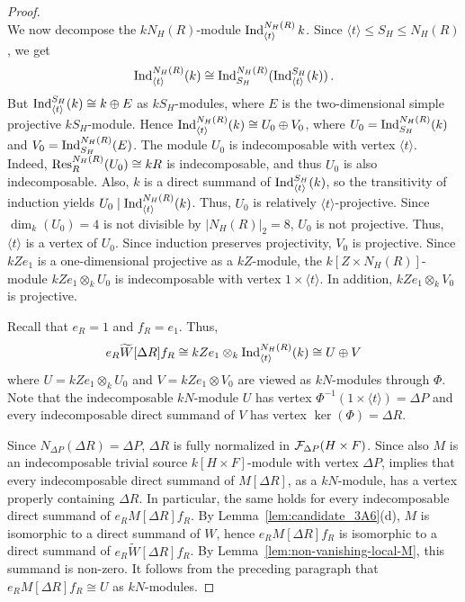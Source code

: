 \begin{proof}
\[    \]
    We now decompose the $kN_H(R)$-module $\operatorname{Ind}^{N_H(R)}_{\langle t\rangle} k$. Since $\langle t\rangle\le S_H\le N_H(R)$, we get 
    \[
    \operatorname{Ind}^{N_H(R)}_{\langle t\rangle}(k)\cong \operatorname{Ind}^{N_H(R)}_{S_H}(\operatorname{Ind}^{S_H}_{\langle t\rangle}(k))\,.
    \]
    But $\operatorname{Ind}^{S_H}_{\langle t\rangle}(k)\cong k\oplus E$ as $kS_H$-modules, where $E$ is the two-dimensional simple projective $kS_H$-module. Hence $\operatorname{Ind}^{N_H(R)}_{\langle t\rangle}(k)\cong U_0\oplus V_0$, where $U_0=\operatorname{Ind}^{N_H(R)}_{S_H}(k)$ and $V_0=\operatorname{Ind}^{N_H(R)}_{S_H}(E)$. The module $U_0$ is indecomposable with vertex $\langle t\rangle$. Indeed, $\operatorname{Res}^{N_H(R)}_R(U_0)\cong kR$ is indecomposable, and thus $U_0$ is also indecomposable. Also, $k$ is a direct summand of $\operatorname{Ind}^{S_H}_{\langle t\rangle}(k)$, so the transitivity of induction yields $U_0\mid \operatorname{Ind}^{N_H(R)}_{\langle t\rangle}(k)$. Thus, $U_0$ is relatively $\langle t\rangle$-projective. Since $\dim_k(U_0)=4$ is not divisible by $|N_H(R)|_2=8$, $U_0$ is not projective. Thus, $\langle t\rangle$ is a vertex of $U_0$. Since induction preserves projectivity, $V_0$ is projective. Since $kZe_1$ is a one-dimensional projective as a $kZ$-module, the $k[Z\times N_H(R)]$-module $kZe_1\otimes_k U_0$ is indecomposable with vertex $1\times \langle t\rangle$. In addition, $kZe_1\otimes_k V_0$ is projective. 

    Recall that $e_R=1$ and $f_R=e_1$. Thus,
    \[
    e_R\widetilde{W}[\Delta R]f_R\cong kZe_1\otimes_k \operatorname{Ind}^{N_H(R)}_{\langle t\rangle}(k)\cong U\oplus V
    \]
    where $U=kZe_1\otimes_k U_0$ and $V=kZe_1\otimes V_0$ are viewed as $kN$-modules through $\Phi$. Note that the indecomposable $kN$-module $U$ has vertex $\Phi^{-1}(1\times \langle t\rangle)=\Delta P$ and every indecomposable direct summand of $V$ has vertex $\ker(\Phi)=\Delta R$. 

    Since $N_{\Delta P}(\Delta R)= \Delta P$, $\Delta R$ is fully normalized in $\mathcal{F}_{\Delta P}(H\times F)$. Since also $M$ is an indecomposable trivial source $k[H\times F]$-module with vertex $\Delta P$, \cite[Lemma~6.4]{KunugiSuzuki} implies that every indecomposable direct summand of $M[\Delta R]$, as a $kN$-module, has a vertex properly containing $\Delta R$. In particular, the same holds for every indecomposable direct summand of $e_RM[\Delta R]f_R$. By Lemma~\ref{lem:candidate_3A6}(d), $M$ is isomorphic to a direct summand of $W$, hence $e_RM[\Delta R]f_R$ is isomorphic to a direct summand of $e_R\widetilde{W}[\Delta R]f_R$. By Lemma~\ref{lem:non-vanishing-local-M}, this summand is non-zero. It follows from the preceding paragraph that $e_RM[\Delta R]f_R\cong U$ as $kN$-modules. 


\end{proof}

